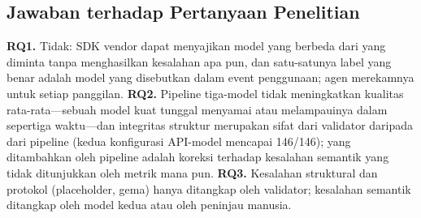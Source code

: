 \subsection{Jawaban terhadap Pertanyaan Penelitian}
\textbf{RQ1.} Tidak: SDK vendor dapat menyajikan model yang berbeda dari yang diminta tanpa menghasilkan kesalahan apa pun, dan satu-satunya label yang benar adalah model yang disebutkan dalam event penggunaan; agen merekamnya untuk setiap panggilan. \textbf{RQ2.} Pipeline tiga-model tidak meningkatkan kualitas rata-rata---sebuah model kuat tunggal menyamai atau melampauinya dalam sepertiga waktu---dan integritas struktur merupakan sifat dari validator daripada dari pipeline (kedua konfigurasi API-model mencapai 146/146); yang ditambahkan oleh pipeline adalah koreksi terhadap kesalahan semantik yang tidak ditunjukkan oleh metrik mana pun. \textbf{RQ3.} Kesalahan struktural dan protokol (placeholder, gema) hanya ditangkap oleh validator; kesalahan semantik ditangkap oleh model kedua atau oleh peninjau manusia.
